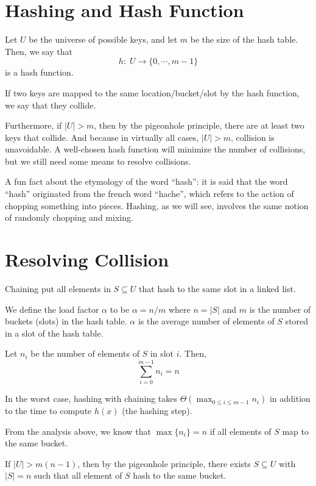 \section{Hashing and Hash Function} 

Let $U$ be the universe of possible keys, and let $m$ be the size of the hash table. Then, we say that
$$
h:\; U \to \{0, \cdots, m-1 \}
$$
is a hash function.

If two keys are mapped to the same location/bucket/slot by the hash function, we say that they collide.

Furthermore, if $|U| > m$, then by the pigeonhole principle, there are at least two keys that collide. And because in virtually all cases, $|U| > m$, collision is unavoidable. A well-chosen hash function will minimize the number of collisions, but we still need some means to resolve collisions.

\begin{remark}
    A fun fact about the etymology of the word ``hash'': it is said that the word ``hash'' originated from the french word ``hache'', which refers to the action of chopping something into pieces. Hashing, as we will see, involves the same notion of randomly chopping and mixing.
\end{remark}

\section{Resolving Collision}

Chaining put all elements in $S \subseteq U$ that hash to the same slot in a linked list.

We define the load factor $\alpha$ to be $\alpha = n/m$ where $n = |S|$ and $m$ is the number of buckets (slots) in the hash table. $\alpha$ is the average number of elements of $S$ stored in a slot of the hash table.

Let $n_i$ be the number of elements of $S$ in slot $i$. Then,
$$
\sum_{i=0}^{m-1} n_i = n
$$

In the worst case, hashing with chaining takes $\Theta(\max_{0 \leq i \leq m-1} n_i)$ in addition to the time to compute $h(x)$ (the hashing step).

From the analysis above, we know that $\max\{n_i\} = n$ if all elements of $S$ map to the same bucket.

If $|U| > m(n-1)$, then by the pigeonhole principle, there exists $S \subseteq U$ with $|S|=n$ such that all element of $S$ hash to the same bucket.

